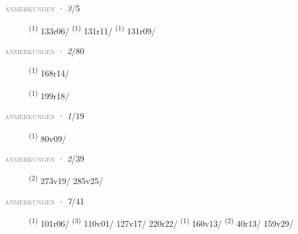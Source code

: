 \textsc{\textcolor{gray}{anmerkungen}}
\ENTRYEND
\noindent{} · \textit{3}/5 \LEMMALINE
\begin{description}
    \item[]  \textsuperscript{(1)} \mbox{133r06/} \CASEBREAK {} \textsuperscript{(1)} \mbox{131r11/} \CASEBREAK {} \textsuperscript{(1)} \mbox{131r09/}
\end{description}
\textsc{\textcolor{gray}{anmerkungen}}
\ENTRYEND
\noindent{} · \textit{2}/80 \LEMMALINE
\begin{description}
    \item[]  \textsuperscript{(1)} \mbox{168r14/}
    \item[]  \textsuperscript{(1)} \mbox{199r18/}
\end{description}
\textsc{\textcolor{gray}{anmerkungen}}
\ENTRYEND
\noindent{} · \textit{1}/19 \LEMMALINE
\begin{description}
    \item[]  \textsuperscript{(1)} \mbox{80v09/}
\end{description}
\textsc{\textcolor{gray}{anmerkungen}}
\ENTRYEND
\noindent{} · \textit{2}/39 \LEMMALINE
\begin{description}
    \item[]  \textsuperscript{(2)} \mbox{273v19/} \mbox{285v25/}
\end{description}
\textsc{\textcolor{gray}{anmerkungen}}
\ENTRYEND
\noindent{} · \textit{7}/41 \LEMMALINE
\begin{description}
    \item[]  \textsuperscript{(1)} \mbox{101r06/} \textsuperscript{(3)} \mbox{110v01/} \mbox{127v17/} \mbox{220r22/} \textsuperscript{(1)} \mbox{160v13/} \CASEBREAK {} \textsuperscript{(2)} \mbox{40r13/} \mbox{159v29/}
\end{description}
